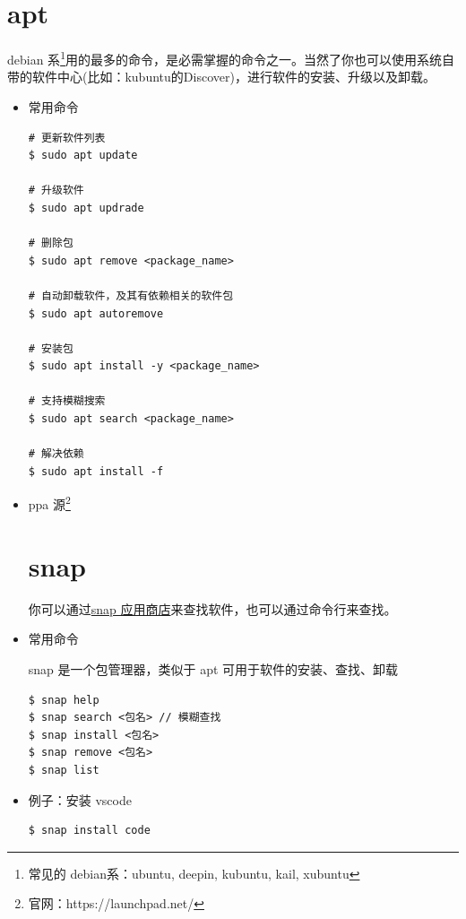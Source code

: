 \section{apt}
debian 系\footnote{常见的 debian系：ubuntu, deepin, kubuntu, kail, xubuntu}用的最多的命令，是必需掌握的命令之一。当然了你也可以使用系统自带的软件中心(比如：kubuntu的Discover)，进行软件的安装、升级以及卸载。
\begin{itemize}
\item 常用命令
\begin{lstlisting}
# 更新软件列表
$ sudo apt update 

# 升级软件
$ sudo apt updrade 

# 删除包
$ sudo apt remove <package_name>

# 自动卸载软件，及其有依赖相关的软件包
$ sudo apt autoremove 

# 安装包
$ sudo apt install -y <package_name>

# 支持模糊搜索  
$ sudo apt search <package_name> 

# 解决依赖
$ sudo apt install -f
\end{lstlisting}


\item ppa 源\footnote{官网：https://launchpad.net/}
\newpage
	
\section{snap}
你可以通过\href{https://snapcraft.io/}{snap 应用商店}来查找软件，也可以通过命令行来查找。

\item 常用命令

snap 是一个包管理器，类似于 apt 可用于软件的安装、查找、卸载
\begin{lstlisting}
$ snap help 
$ snap search <包名> // 模糊查找
$ snap install <包名>
$ snap remove <包名>
$ snap list 
\end{lstlisting}

\item 例子：安装 vscode 
\begin{lstlisting}
$ snap install code
\end{lstlisting}
\end{itemize}


